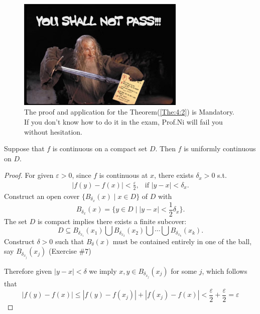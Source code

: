 %
%
%
%
%
\begin{figure}[H]
\centering
\includegraphics[width=8cm]{week4/4_2.jpeg}
\caption{The proof and application for the Theorem(\ref{The:4:2}) is Mandatory. If you don't know how to do it in the exam, Prof.Ni will fail you without hesitation.}
\end{figure}
\begin{theorem}\label{The:4:2}
Suppose that $f$ is continuous on a compact set $D$. Then $f$ is uniformly continuous on $D$.
\end{theorem}
\begin{proof}
For given $\varepsilon>0$, since $f$ is continuous at $x$, there exists $\delta_x>0$ s.t.
\[
\begin{array}{ll}
|f(y)-f(x)|<\frac{\varepsilon}{2},
&
\mbox{if }|y-x|<\delta_x.
\end{array}
\]
Construct an open cover $\{B_{\delta_x}(x)\mid x\in D\}$ of $D$ with
\[
B_{\delta_x}(x) = \{y\in D\mid |y-x|<\frac{1}{2}\delta_x\}.
\]
The set $D$ is compact implies there exists a finite subcover:
\begin{equation}
D\subseteq B_{\delta_{x_1}}(x_1)\bigcup 
B_{\delta_{x_2}}(x_2)\bigcup\cdots\bigcup
B_{\delta_{x_k}}(x_k).\label{Eq:4:1}
\end{equation}
Construct $\delta>0$ such that $B_\delta(x)$ must be contained entirely in one of the ball, say $B_{\delta_{x_j}}(x_j)$ (Exercise $\#7$)

Therefore given $|y-x|<\delta$ we imply $x,y\in B_{\delta_{x_j}}(x_j)$ for some $j$, which follows that
\[
|f(y) - f(x)| \le |f(y) - f(x_j)|+|f(x_j) - f(x)|<\frac{\varepsilon}{2}+\frac{\varepsilon}{2}=\varepsilon
\]
\end{proof}
